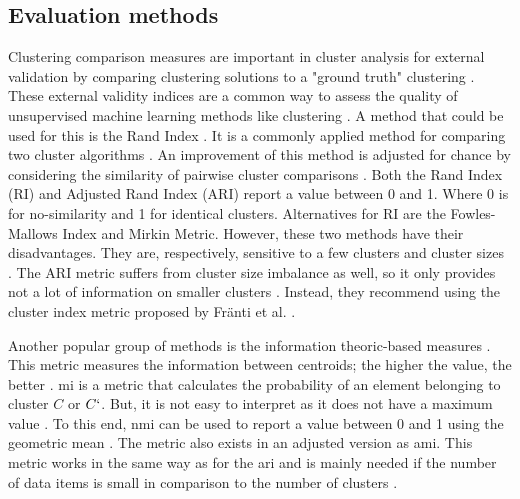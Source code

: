 \subsection{Evaluation methods} \label{theory:evaluate}
Clustering comparison measures are important in cluster analysis for external validation by comparing clustering solutions to a "ground truth" clustering \citep{vinh_information_nodate}.
These external validity indices are a common way to assess the quality of unsupervised machine learning methods like clustering \citep{warrens_understanding_2022}.
A method that could be used for this is the Rand Index \citep{rand_objective_1971}.
It is a commonly applied method for comparing two cluster algorithms \citep{wagner_comparing_nodate}.
An improvement of this method is adjusted for chance by considering the similarity of pairwise cluster comparisons \citep{vinh_information_nodate}.
Both the Rand Index (RI) and Adjusted Rand Index (ARI) \citep{hubert_comparing_1985} report a value between 0 and 1.
Where 0 is for no-similarity and 1 for identical clusters.
Alternatives for RI are the Fowles-Mallows Index and Mirkin Metric.
However, these two methods have their disadvantages. They are, respectively, sensitive to a few clusters and cluster sizes \citep{wagner_comparing_nodate}.
The ARI metric suffers from cluster size imbalance as well, so it only provides not a lot of information on smaller clusters \citep{warrens_understanding_2022}.
Instead, they recommend using the cluster index metric proposed by Fränti et al. \citep{franti_centroid_2014}.

Another popular group of methods is the information theoric-based measures \citep{vinh_information_nodate}.
This metric measures the information between centroids; the higher the value, the better \citep{vinh_information_nodate}.
\gls{mi} is a metric that calculates the probability of an element belonging to cluster $C$ or $C`$.
But, it is not easy to interpret as it does not have a maximum value \citep{wagner_comparing_nodate}.
To this end, \gls{nmi} can be used to report a value between 0 and 1 using the geometric mean \citep{strehl_cluster_2002}.
The metric also exists in an adjusted version as \gls{ami}.
This metric works in the same way as for the \gls{ari} and is mainly needed if the number of data items is small in comparison to the number of clusters \citep{vinh_information_nodate}. \newline

